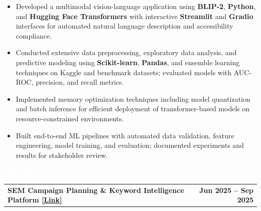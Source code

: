 \documentclass[10pt,a4paper]{article}
\makeatletter
\newcommand{\resumesection}[1]{%
    \vspace{2pt}
    \noindent
    \colorbox{sectionblack}{%
        \parbox{\dimexpr\linewidth-2\fboxsep\relax}{%
            \centering
            \textcolor{white}{\textbf{\normalsize #1}}
        }%
    }%
    \vspace{1pt}
}
\newcommand{\entry}[2]{%
    \noindent
    \begin{tabularx}{\linewidth}{@{}X r@{}}
        \textbf{#1} & \textbf{#2}
    \end{tabularx}
    \vspace{-2pt}
}
\makeatother
\begin{document}
\begin{itemize}

\item Developed a multimodal vision-language application using \textbf{BLIP-2}, \textbf{Python}, and \textbf{Hugging Face Transformers} with interactive \textbf{Streamlit} and \textbf{Gradio} interfaces for automated natural language description and accessibility compliance.

\item Conducted extensive data preprocessing, exploratory data analysis, and predictive modeling using \textbf{Scikit-learn}, \textbf{Pandas}, and ensemble learning techniques on Kaggle and benchmark datasets; evaluated models with AUC-ROC, precision, and recall metrics.

\item Implemented memory optimization techniques including model quantization and batch inference for efficient deployment of transformer-based models on resource-constrained environments.

\item Built end-to-end ML pipelines with automated data validation, feature engineering, model training, and evaluation; documented experiments and results for stakeholder review.

\end{itemize}


\resumesection{PROJECTS}

\entry
{SEM Campaign Planning \& Keyword Intelligence Platform
\hspace{2pt}
\href{https://github.com/marideharshith21}
{\textcolor{linkblue}{[Link]}}}
{Jun 2025 -- Sep 2025}
\end{document}
